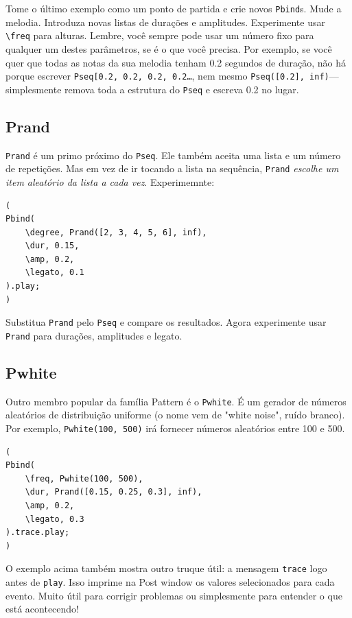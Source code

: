 Tome o último exemplo como um  ponto de partida e crie novos \texttt{Pbind}s. Mude a melodia. Introduza novas listas de durações e amplitudes. Experimente usar \texttt{\textbackslash freq} para alturas. Lembre, você sempre pode usar um número fixo para qualquer um destes parâmetros, se é o que você precisa. Por exemplo, se você quer que todas as notas da sua melodia tenham 0.2 segundos de duração, não há porque escrever \texttt{Pseq[0.2, 0.2, 0.2, 0.2\dots}, nem mesmo \texttt{Pseq([0.2], inf)}---simplesmente remova toda a estrutura do \texttt{Pseq} e escreva 0.2 no lugar.

\subsection{Prand}

\texttt{Prand} é um primo próximo do \texttt{Pseq}. Ele também aceita uma lista e um número de repetições. Mas em vez de ir tocando a lista na sequência, \texttt{Prand} \emph{escolhe um item aleatório da lista a cada vez}. Experimemnte:

 
\begin{lstlisting}[style=SuperCollider-IDE, basicstyle=\scttfamily\footnotesize]
(
Pbind(
	\degree, Prand([2, 3, 4, 5, 6], inf),
	\dur, 0.15,
	\amp, 0.2,
	\legato, 0.1
).play;
)
\end{lstlisting}
 

Substitua \texttt{Prand} pelo \texttt{Pseq} e compare os resultados. Agora experimente usar \texttt{Prand} para durações, amplitudes e legato.

\subsection{Pwhite}

Outro membro popular da família Pattern é o \texttt{Pwhite}. É um gerador de números aleatórios de distribuição uniforme (o nome vem de "white noise", ruído branco). Por exemplo, \texttt{Pwhite(100, 500)} irá fornecer números aleatórios entre 100 e 500.
 
\begin{lstlisting}[style=SuperCollider-IDE, basicstyle=\scttfamily\footnotesize]
(
Pbind(
	\freq, Pwhite(100, 500),
	\dur, Prand([0.15, 0.25, 0.3], inf),
	\amp, 0.2,
	\legato, 0.3
).trace.play;
)
\end{lstlisting}
 

O exemplo acima também mostra outro truque útil: a mensagem \texttt{trace} logo antes de \texttt{play}. Isso imprime na Post window os valores selecionados para cada evento. Muito útil para corrigir problemas ou simplesmente para entender o que está acontecendo!

